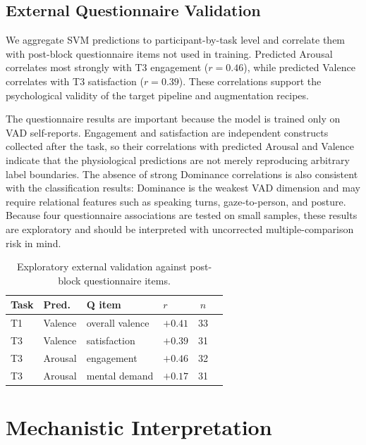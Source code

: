 \documentclass[sigconf,review,anonymous]{acmart}
\begin{document}
\subsection{External Questionnaire Validation}
\label{sec:questionnaire}

We aggregate SVM predictions to participant-by-task level and correlate them
with post-block questionnaire items not used in training.
Predicted Arousal correlates most strongly with T3 engagement ($r=0.46$),
while predicted Valence correlates with T3 satisfaction ($r=0.39$).
These correlations support the psychological validity of the target pipeline
and augmentation recipes.

The questionnaire results are important because the model is trained only on
VAD self-reports.
Engagement and satisfaction are independent constructs collected after the
task, so their correlations with predicted Arousal and Valence indicate that
the physiological predictions are not merely reproducing arbitrary label
boundaries.
The absence of strong Dominance correlations is also consistent with the
classification results: Dominance is the weakest VAD dimension and may require
relational features such as speaking turns, gaze-to-person, and posture.
Because four questionnaire associations are tested on small samples, these
results are exploratory and should be interpreted with uncorrected
multiple-comparison risk in mind.

\begin{table}[t]
\caption{Exploratory external validation against post-block questionnaire
items.}
\label{tab:q}
\centering
\setlength{\tabcolsep}{3pt}
\footnotesize
\begin{tabular}{@{}llllcc@{}}
\toprule
\textbf{Task} & \textbf{Pred.} & \textbf{Q item} & \textbf{$r$} & \textbf{$n$} \\
\midrule
T1 & Valence & overall valence & $+0.41$ & 33 \\
T3 & Valence & satisfaction    & $+0.39$ & 31 \\
T3 & Arousal & engagement      & $+0.46$ & 32 \\
T3 & Arousal & mental demand   & $+0.17$ & 31 \\
\bottomrule
\end{tabular}
\end{table}

\section{Mechanistic Interpretation}
\label{sec:mechanism}
\end{document}
